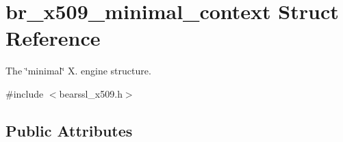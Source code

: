 \hypertarget{structbr__x509__minimal__context}{}\section{br\+\_\+x509\+\_\+minimal\+\_\+context Struct Reference}
\label{structbr__x509__minimal__context}


The \char`\"{}minimal\char`\"{} X. engine structure.  




{\ttfamily \#include $<$bearssl\+\_\+x509.\+h$>$}

\subsection*{Public Attributes}
